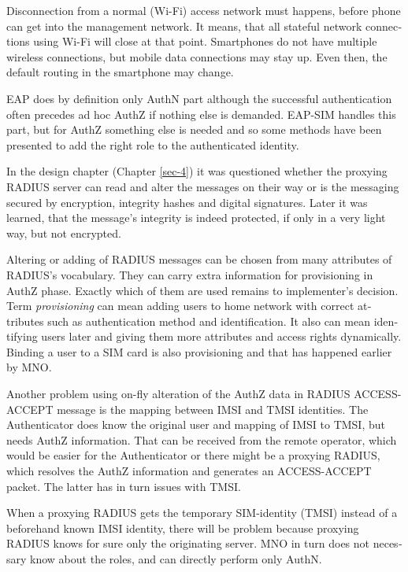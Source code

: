 \documentclass[12pt,a4paper,english]{tutthesis}
\begin{document}
\begin{otherlanguage}{english}
Disconnection from a normal (Wi-Fi) access network must happens, before phone can get
into the management network. It means, that all stateful network
connections using Wi-Fi will close at that point. Smartphones do not
have multiple wireless connections, but mobile data connections may 
stay up. Even then, the default routing in the smartphone may change.


EAP does by definition only AuthN part although the successful
authentication often precedes ad hoc AuthZ if nothing else is demanded.
EAP-SIM handles this part, but for AuthZ something else is needed
and so some methods have been presented to add the right role to 
the authenticated identity.



In the design chapter (Chapter \ref{sec-4}) it was questioned whether the proxying RADIUS server
can read and alter the messages on their way or is the messaging secured
by encryption, integrity hashes and digital signatures.
Later it was learned, that the message's integrity is indeed protected, if
only in a very light way, but not encrypted.

Altering or adding of  RADIUS messages can be chosen from many
attributes of RADIUS's vocabulary. They can carry extra information
for provisioning in AuthZ phase. Exactly which of them are used
remains to implementer's  decision. 
Term \emph{provisioning} can mean adding users to home network with correct
attributes such as authentication method and identification.
It also can mean identifying users later and giving
them more attributes and access rights dynamically.
Binding a user to a SIM card is also provisioning and that has
happened earlier by MNO.













Another problem using on-fly alteration of the AuthZ data in RADIUS ACCESS-ACCEPT message
is the mapping between IMSI and TMSI identities.
The Authenticator does know the original user and mapping of IMSI to
TMSI, but needs AuthZ information. That can be received from the
remote operator, which would be easier for the
Authenticator or there might be a proxying RADIUS, which resolves the
AuthZ information and generates an ACCESS-ACCEPT packet. The latter
has in turn issues with TMSI.

When a proxying RADIUS gets the temporary SIM-identity (TMSI) instead
of a beforehand known IMSI identity, there will be problem
because proxying RADIUS knows for sure only the originating server. 
MNO in turn does not necessary know about the roles, and can directly
perform only AuthN.


\end{otherlanguage}
\end{document}
